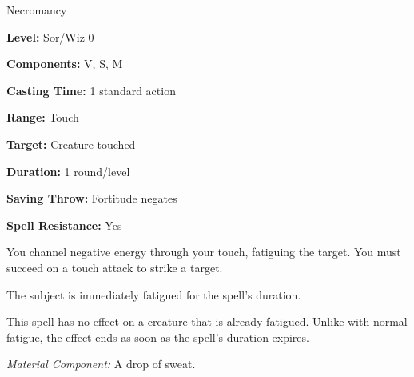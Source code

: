 
Necromancy

\textbf{Level:} Sor/Wiz 0

\textbf{Components:} V, S, M

\textbf{Casting Time:} 1 standard action

\textbf{Range:} Touch

\textbf{Target:} Creature touched

\textbf{Duration:} 1 round/level

\textbf{Saving Throw:} Fortitude negates

\textbf{Spell Resistance:} Yes

You channel negative energy through your touch, fatiguing the target. You must 
succeed on a touch attack to strike a target.

The subject is immediately fatigued for the spell's duration.

This spell has no effect on a creature that is already fatigued. Unlike with normal 
fatigue, the effect ends as soon as the spell's duration expires.

\textit{Material Component:} A drop of sweat.

